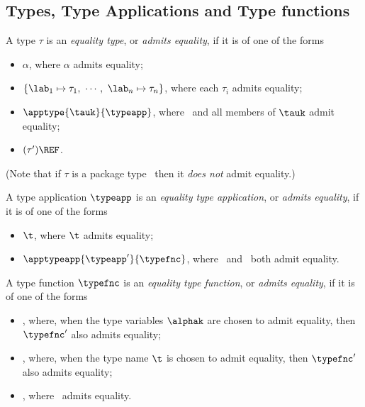 \subsection{Types, Type Applications and Type functions} %
\label{tyfun-sec}
A type $\tau$ is an {\sl equality type}, or {\sl admits equality}, if it is
of one of the forms
\begin{itemize}
\item $\alpha$, where $\alpha$ admits equality;
\item $\{\lab_1\mapsto\tau_1,\ \cdots,\ \lab_n\mapsto\tau_n\}$,
      where each $\tau_i$ admits equality;
\item $\apptype{\tauk}{\typeapp}$, where \typeapp\ and all members of $\tauk$ admit equality; %

\item $(\tau')\REF$.
\end{itemize}
(Note that  if $\tau$ is a package type \longpackagetype\ then 
it \emph{does not} admit equality.)

A type application $\typeapp$ is an {\sl equality type application},
 or {\sl admits equality}, if it is
of one of the forms
\begin{itemize}
\item $\t$, where $\t$ admits equality;
\item $\apptypeapp{\typeapp'}{\typefnc}$, where \typeapp\ and \typefnc\ both
       admit equality.
\end{itemize}

A type function $\typefnc$ is an {\sl equality type function},
 or {\sl admits equality}, if it is
of one of the forms
\begin{itemize}
\item {}, where, when the type variables $\alphak$
      are chosen to admit equality, then $\typefnc'$ also admits equality;
\item {}, where,  when the type name $\t$
      is chosen to admit equality, then $\typefnc'$ also admits equality;
\item \typeapptypefnc{\typeapp}, where \typeapp\ admits equality.
\end{itemize}


